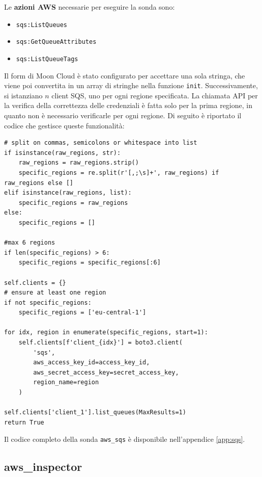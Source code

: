 \noindent Le \textbf{azioni AWS} necessarie per eseguire la sonda sono:

\begin{itemize}
    \item \texttt{sqs:ListQueues}
    \item \texttt{sqs:GetQueueAttributes}
    \item \texttt{sqs:ListQueueTags}
\end{itemize}

Il form di Moon Cloud è stato configurato per accettare una sola stringa, che viene poi convertita in un array di stringhe nella funzione \texttt{init}. Successivamente, si istanziano $n$ client SQS, uno per ogni regione specificata. La chiamata API per la verifica della correttezza delle credenziali è fatta solo per la prima regione, in quanto non è necessario verificarle per ogni regione. Di seguito è riportato il codice che gestisce queste funzionalità:

\begin{lstlisting}[style=mypython, caption={Parte della funzione \texttt{init} per la sonda \texttt{aws\_sqs}}]
# split on commas, semicolons or whitespace into list
if isinstance(raw_regions, str):
    raw_regions = raw_regions.strip()
    specific_regions = re.split(r'[,;\s]+', raw_regions) if raw_regions else []
elif isinstance(raw_regions, list):
    specific_regions = raw_regions
else:
    specific_regions = []

#max 6 regions
if len(specific_regions) > 6:
    specific_regions = specific_regions[:6]

self.clients = {}
# ensure at least one region
if not specific_regions:
    specific_regions = ['eu-central-1']

for idx, region in enumerate(specific_regions, start=1):
    self.clients[f'client_{idx}'] = boto3.client(
        'sqs',
        aws_access_key_id=access_key_id,
        aws_secret_access_key=secret_access_key,
        region_name=region
    )

self.clients['client_1'].list_queues(MaxResults=1)
return True
\end{lstlisting}

Il codice completo della sonda \texttt{aws\_sqs} è disponibile nell'appendice \ref{app:sqs}.

\subsection{aws\_inspector}
\label{sec:inspector}

